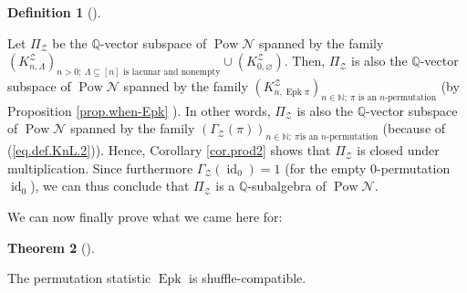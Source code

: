 \documentclass[numbers=enddot,12pt,final,onecolumn,notitlepage]{scrartcl}%
\theoremstyle{definition}
\newtheorem{theo}{Theorem}[section]
\newenvironment{theorem}[1][]
{\begin{theo}[#1]\begin{leftbar}}
{\end{leftbar}\end{theo}}
\newtheorem{defi}[theo]{Definition}
\newenvironment{definition}[1][]
{\begin{defi}[#1]\begin{leftbar}}
{\end{leftbar}\end{defi}}
\begin{document}
\begin{definition}
Let $\Pi_{\mathcal{Z}}$ be the $\mathbb{Q}$-vector subspace of
$\operatorname*{Pow}\mathcal{N}$ spanned by the family $\left(  K_{n,\Lambda
}^{\mathcal{Z}}\right)  _{n>0;\ \Lambda\subseteq\left[  n\right]  \text{ is
lacunar and nonempty}}\cup\left(  K_{0,\varnothing}^{\mathcal{Z}}\right)  $.
Then, $\Pi_{\mathcal{Z}}$ is also the $\mathbb{Q}$-vector subspace of
$\operatorname*{Pow}\mathcal{N}$ spanned by the family $\left(
K_{n,\operatorname*{Epk}\pi}^{\mathcal{Z}}\right)  _{n\in\mathbb{N}%
;\ \pi\text{ is an }n\text{-permutation}}$ (by Proposition \ref{prop.when-Epk}%
). In other words, $\Pi_{\mathcal{Z}}$ is also the $\mathbb{Q}$-vector
subspace of $\operatorname*{Pow}\mathcal{N}$ spanned by the family $\left(
\Gamma_{\mathcal{Z}}\left(  \pi\right)  \right)  _{n\in\mathbb{N};\ \pi\text{
is an }n\text{-permutation}}$ (because of (\ref{eq.def.KnL.2})). Hence,
Corollary \ref{cor.prod2} shows that $\Pi_{\mathcal{Z}}$ is closed under
multiplication. Since furthermore $\Gamma_{\mathcal{Z}}\left(
\operatorname*{id}\nolimits_{0}\right)  =1$ (for the empty $0$-permutation
$\operatorname*{id}\nolimits_{0}$), we can thus conclude that $\Pi
_{\mathcal{Z}}$ is a $\mathbb{Q}$-subalgebra of $\operatorname*{Pow}%
\mathcal{N}$.
\end{definition}

We can now finally prove what we came here for:

\begin{theorem}
\label{thm.Epk.sh-co-a}The permutation statistic $\operatorname*{Epk}$ is shuffle-compatible.
\end{theorem}
\end{document}
